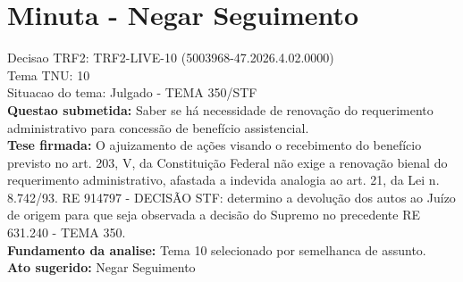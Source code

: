 \documentclass{article}
\begin{document}
\section*{Minuta - Negar Seguimento}
Decisao TRF2: TRF2-LIVE-10 (5003968-47.2026.4.02.0000)\\
Tema TNU: 10\\
Situacao do tema: Julgado - TEMA 350/STF\\
\textbf{Questao submetida:} Saber se há necessidade de renovação do requerimento administrativo para concessão de benefício assistencial.\\
\textbf{Tese firmada:} O ajuizamento de ações visando o recebimento do benefício previsto no art. 203, V, da Constituição Federal não exige a renovação bienal do requerimento administrativo, afastada a indevida analogia ao art. 21, da Lei n. 8.742/93. RE 914797 - DECISÃO STF: determino a devolução dos autos ao Juízo de origem para que seja observada a decisão do Supremo no precedente RE 631.240 - TEMA 350.\\
\textbf{Fundamento da analise:} Tema 10 selecionado por semelhanca de assunto.\\
\textbf{Ato sugerido:} Negar Seguimento
\end{document}
